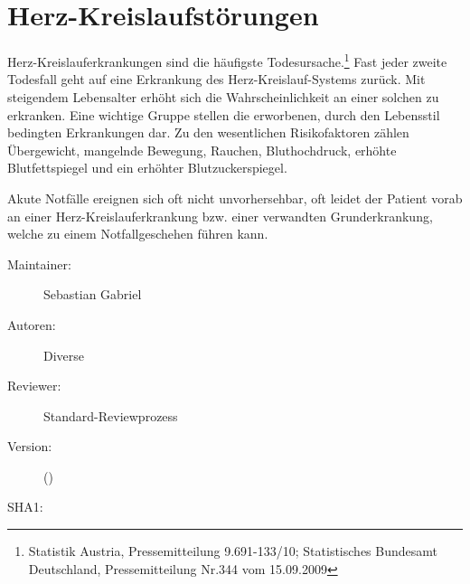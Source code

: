 % 
% 
% 
% 
\def\ChapterCode{HKL}
\chapter
[\CO{[HKL]} Herz-Kreis\-lauf\-stör\-ung\-en]
{Herz-Kreis\-lauf\-stör\-ung\-en}
\label{chp:HKL}
\ChapterIntro
{%
Herz-Kreislauferkrankungen sind die häufigste
Todesursache.\footnote{Statistik Austria, Pressemitteilung
9.691-133/10; Statistisches Bundesamt Deutschland,
Pressemitteilung Nr.344 vom 15.09.2009} Fast jeder zweite
Todesfall geht auf eine Erkrankung des
Herz-Kreislauf-Systems zurück.  Mit steigendem Lebensalter
erhöht sich die Wahrscheinlichkeit an einer solchen zu
erkranken. 
Eine wichtige Gruppe stellen die erworbenen, durch den
Lebensstil bedingten Erkrankungen dar. Zu den wesentlichen
Risikofaktoren zählen Übergewicht, mangelnde Bewegung,
Rauchen, Bluthochdruck, erhöhte Blutfettspiegel und ein
erhöhter Blutzuckerspiegel.

Akute Notfälle ereignen sich oft nicht unvorhersehbar, oft
leidet der Patient vorab an  einer
Herz-Kreislauferkrankung bzw. einer verwandten
Grunderkrankung, welche zu einem Notfallgeschehen führen
kann.
}
{%
\begin{description}
  \item[Maintainer:] Sebastian Gabriel
  \item[Autoren:] Diverse
  \item[Reviewer:] Standard-Reviewprozess
  \item[Version:] {\VarDocVersionTypeName} ({\VarDocVersionTypeDescription})
  \item[SHA1:] {\DocGitCommit}
\end{description}

{\TxTeilkapitelAASS}
}


